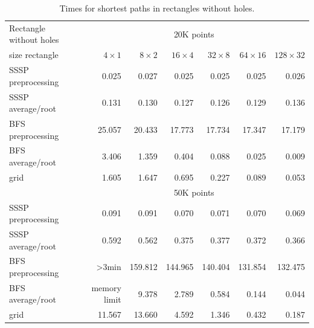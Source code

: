 \documentclass[a4paper,USenglish]{lipics}
\begin{document}
\begin{table}
\begin{tabular}{l*{6}{r}}
Rectangle without holes & \multicolumn{6}{c}{20K points}\\						
size rectangle	&	$4\times 1$	&	$8\times 2$	&	$16\times 4$	&	$32\times 8$	&	$64\times 16$	&	$128\times 32$	\\
\hline
SSSP preprocessing	&	0.025	&	0.027	&	0.025	&	0.025	&	0.025	&	0.026	\\
SSSP average/root	&	0.131	&	0.130	&	0.127	&	0.126	&	0.129	&	0.136	\\
BFS preprocessing	&	25.057	&	20.433	&	17.773	&	17.734	&	17.347	&	17.179	\\
BFS average/root	&	3.406	&	1.359	&	0.404	&	0.088	&	0.025	&	0.009	\\
grid	&	1.605	&	1.647	&	0.695	&	0.227	&	0.089	&	0.053	\vspace{.2cm}	\\
\hline
  & \multicolumn{6}{c}{50K points}\\						
\hline
SSSP preprocessing	&	0.091	&	0.091	&	0.070	&	0.071	&	0.070	&	0.069	\\
SSSP average/root	&	0.592	&	0.562	&	0.375	&	0.377	&	0.372	&	0.366	\\
BFS preprocessing	&	>3min	&	159.812	&	144.965	&	140.404	&	131.854	&	132.475	\\
BFS average/root	& memory limit & 9.378	&	2.789	&	0.584	&	0.144	&	0.044	\\
grid				&	11.567	&	13.660	&	4.592	&	1.346	&	0.432	&	0.187
\end{tabular}
\caption{Times for shortest paths in rectangles without holes.}
\label{table1}
\end{table}
\end{document}

